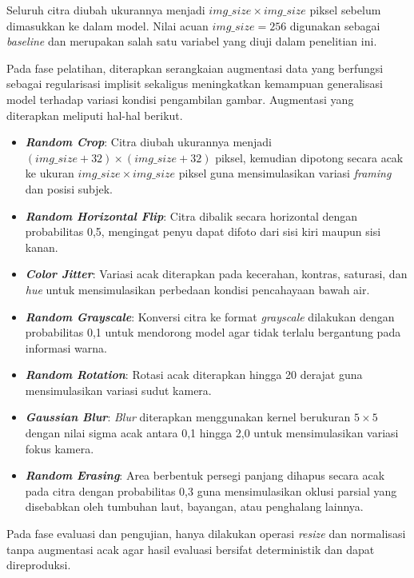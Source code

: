 Seluruh citra diubah ukurannya menjadi $\mathit{img\_size} \times \mathit{img\_size}$ piksel sebelum dimasukkan ke dalam model. Nilai acuan $\mathit{img\_size} = 256$ digunakan sebagai \textit{baseline} dan merupakan salah satu variabel yang diuji dalam penelitian ini.

Pada fase pelatihan, diterapkan serangkaian augmentasi data yang berfungsi sebagai regularisasi implisit sekaligus meningkatkan kemampuan generalisasi model terhadap variasi kondisi pengambilan gambar. Augmentasi yang diterapkan meliputi hal-hal berikut.

\begin{itemize}
    \item \textbf{\textit{Random Crop}}: Citra diubah ukurannya menjadi $(\mathit{img\_size} + 32) \times (\mathit{img\_size} + 32)$ piksel, kemudian dipotong secara acak ke ukuran $\mathit{img\_size} \times \mathit{img\_size}$ piksel guna mensimulasikan variasi \textit{framing} dan posisi subjek.
    \item \textbf{\textit{Random Horizontal Flip}}: Citra dibalik secara horizontal dengan probabilitas 0,5, mengingat penyu dapat difoto dari sisi kiri maupun sisi kanan.
    \item \textbf{\textit{Color Jitter}}: Variasi acak diterapkan pada kecerahan, kontras, saturasi, dan \textit{hue} untuk mensimulasikan perbedaan kondisi pencahayaan bawah air.
    \item \textbf{\textit{Random Grayscale}}: Konversi citra ke format \textit{grayscale} dilakukan dengan probabilitas 0,1 untuk mendorong model agar tidak terlalu bergantung pada informasi warna.
    \item \textbf{\textit{Random Rotation}}: Rotasi acak diterapkan hingga 20 derajat guna mensimulasikan variasi sudut kamera.
    \item \textbf{\textit{Gaussian Blur}}: \textit{Blur} diterapkan menggunakan kernel berukuran $5 \times 5$ dengan nilai sigma acak antara 0,1 hingga 2,0 untuk mensimulasikan variasi fokus kamera.
    \item \textbf{\textit{Random Erasing}}: Area berbentuk persegi panjang dihapus secara acak pada citra dengan probabilitas 0,3 guna mensimulasikan oklusi parsial yang disebabkan oleh tumbuhan laut, bayangan, atau penghalang lainnya.
\end{itemize}

Pada fase evaluasi dan pengujian, hanya dilakukan operasi \textit{resize} dan normalisasi tanpa augmentasi acak agar hasil evaluasi bersifat deterministik dan dapat direproduksi.

